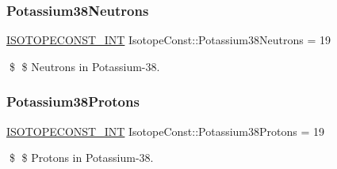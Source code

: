 \subsubsection{\texorpdfstring{Potassium38\+Neutrons}{Potassium38Neutrons}}
{\footnotesize\ttfamily \mbox{\hyperlink{group___isotope_const-_macros_ga5f18360b3e99483a35c32d789e62621c}{I\+S\+O\+T\+O\+P\+E\+C\+O\+N\+S\+T\+\_\+\+I\+NT}} Isotope\+Const\+::\+Potassium38\+Neutrons = 19}

\$ \$ Neutrons in Potassium-\/38. \mbox{\label{group___isotope_const-_potassium-_k38_ga781bd2a6ff81f406e0a633fef6e0f3a6}} 
\subsubsection{\texorpdfstring{Potassium38\+Protons}{Potassium38Protons}}
{\footnotesize\ttfamily \mbox{\hyperlink{group___isotope_const-_macros_ga5f18360b3e99483a35c32d789e62621c}{I\+S\+O\+T\+O\+P\+E\+C\+O\+N\+S\+T\+\_\+\+I\+NT}} Isotope\+Const\+::\+Potassium38\+Protons = 19}

\$ \$ Protons in Potassium-\/38. 